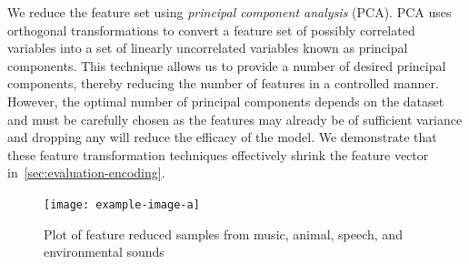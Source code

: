 %
We reduce the feature set using \textit{principal component analysis} (PCA).
%
PCA uses orthogonal transformations to convert a feature set of 
possibly correlated variables into a set of linearly uncorrelated variables
known as principal components. 
%
This technique allows us to provide a number of desired principal components,
thereby reducing the number of features in a controlled manner. 
%
However, the optimal number of principal components depends on the dataset 
and must be carefully chosen as the features may already be of sufficient
variance and dropping any will reduce the efficacy of the model. 
%
%
We demonstrate that these feature transformation techniques effectively
shrink the feature vector in~\cref{sec:evaluation-encoding}.

\begin{figure}[t]
    \centering
    \texttt{[image: example-image-a]}
    \caption{Plot of feature reduced samples from music, animal, speech, and environmental sounds}
    \label{fig:top-dist}
\end{figure}
